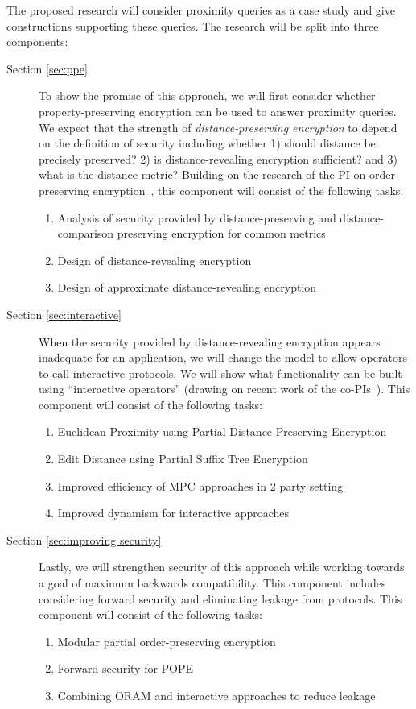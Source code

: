 \noindent
The proposed research will
consider proximity queries as a case study and give constructions supporting
these queries.  The research will be split into three components:
\begin{description}
\item[Section \ref{sec:ppe}] To show the promise of this approach, we will first consider whether property-preserving encryption can be used to answer proximity queries.  We expect that the strength of \emph{distance-preserving encryption} to depend on the definition of security including whether 1) should distance be precisely preserved? 2) is distance-revealing encryption sufficient? and 3) what is the distance metric? Building on the research of the PI on order-preserving encryption~\cite{EC:BCLO09,C:BolCheONe11}, this component will consist of the following tasks:
\begin{enumerate}
\setlength\itemsep{0em}
\item Analysis of security provided by distance-preserving and distance-comparison preserving encryption for common metrics
\item Design of distance-revealing encryption
\item Design of approximate distance-revealing encryption
\end{enumerate}

\item[Section \ref{sec:interactive}] When the security provided by distance-revealing encryption appears inadequate for an application, we will change the model to allow operators to call interactive protocols.  We will show what functionality can be built using ``interactive operators'' (drawing on recent work of the co-PIs~\cite{SP:PKVKMC14,CCS:RACY16}).  This component will consist of the following tasks:
\begin{enumerate}
\setlength\itemsep{0em}
\item Euclidean Proximity using Partial Distance-Preserving Encryption
\item Edit Distance using Partial Suffix Tree Encryption
\item Improved efficiency of MPC approaches in 2 party setting
\item Improved dynamism for interactive approaches
\end{enumerate}

\item[Section \ref{sec:improving security}] Lastly, we will strengthen security of this approach while working towards a goal of maximum backwards compatibility.  This component includes considering forward security and eliminating leakage from protocols. This component will consist of the following tasks:
\begin{enumerate}\setlength\itemsep{0em}
\item Modular partial order-preserving encryption
\item Forward security for POPE
\item Combining ORAM and interactive approaches to reduce leakage
\end{enumerate}
\end{description}

